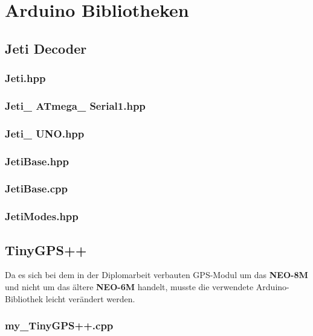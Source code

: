 \section{Arduino Bibliotheken}
\subsection{Jeti Decoder}
\subsubsection{Jeti.hpp}

\subsubsection{Jeti\_ ATmega\_ Serial1.hpp}

\subsubsection{Jeti\_ UNO.hpp}

\subsubsection{JetiBase.hpp}

\subsubsection{JetiBase.cpp}


\newpage
\subsubsection{JetiModes.hpp}

\subsection{TinyGPS++}
Da es sich bei dem in der Diplomarbeit verbauten GPS-Modul um das \textbf{NEO-8M} 
und nicht um das ältere \textbf{NEO-6M} handelt, musste die verwendete Arduino-Bibliothek leicht verändert werden.
\subsubsection{my\_TinyGPS++.cpp}

